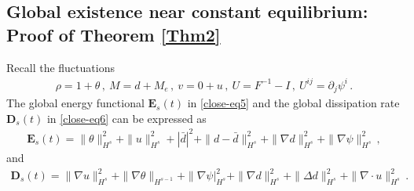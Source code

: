 \documentclass[reqno,11pt]{amsart}
\numberwithin{equation}{section}
\begin{document}
\subsection{Global existence near constant equilibrium: Proof of Theorem \ref{Thm2}}

Recall the fluctuations
\begin{equation}\label{Flc}
    \begin{aligned}
        \rho = 1 + \theta \,, \ M = d + M_e \,, \ v = 0 + u \,, \ U = F^{-1} - I \,, \ U^{ij} = \partial_j \psi^i \,.
    \end{aligned}
\end{equation}
The global energy functional $\mathbf{E}_s (t)$ in \eqref{close-eq5} and the global dissipation rate $\mathbf{D}_s (t)$ in \eqref{close-eq6} can be expressed as
\begin{equation}\label{close-eq5-1}
\begin{aligned}
\mathbf{E}_s (t) = \| \theta \|^2_{H^s} + \| u \|^2_{H^s} + | \bar{d} |^2 + \| d -\bar{d} \|^2_{H^s} + \| \nabla d \|^2_{H^s} + \| \nabla \psi \|^2_{H^s} \,,
\end{aligned}
\end{equation}
and 
\begin{equation}\label{close-eq6-1}
\begin{aligned}
\mathbf{D}_s (t) = \| \nabla u \|^2_{H^s} + \| \nabla \theta \|_{H^{s-1}} + \| \nabla \psi |^2_{H^s} + \| \nabla d \|^2_{H^s} + \| \Delta d \|^2_{H^s} + \| \nabla \cdot u \|^2_{H^s} \,.
\end{aligned}
\end{equation}
\end{document}

